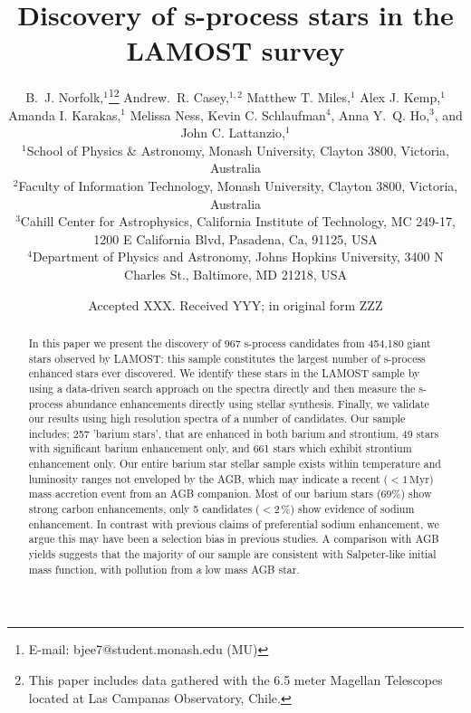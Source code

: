 \documentclass[a4paper,fleqn,usenatbib]{mnras}
\title[S-process stars in LAMOST]{Discovery of s-process stars in the LAMOST survey}
\author[Brodie.~J. Norfolk et al.]{B.~J. Norfolk,$^{1}$\thanks{E-mail: bjee7@student.monash.edu (MU)}\thanks{This paper includes data gathered with the 6.5 meter Magellan Telescopes located at Las Campanas Observatory, Chile.}
Andrew.~R. Casey,$^{1,2}$
Matthew T. Miles,$^{1}$
Alex J. Kemp,$^{1}$ \newauthor
Amanda I. Karakas,$^{1}$
Melissa Ness,
Kevin C. Schlaufman$^{4}$,
Anna Y.~Q. Ho,$^{3}$, \newauthor
and John C. Lattanzio,$^{1}$
\\
$^{1}$School of Physics \& Astronomy, Monash University, Clayton 3800, Victoria, Australia\\
$^{2}$Faculty of Information Technology, Monash University, Clayton 3800, Victoria, Australia\\
$^{3}$Cahill Center for Astrophysics, California Institute of Technology, MC 249-17, 1200 E California Blvd, Pasadena, Ca, 91125, USA\\
$^{4}$Department of Physics and Astronomy, Johns Hopkins University, 3400 N Charles St., Baltimore, MD 21218, USA
}
\date{Accepted XXX. Received YYY; in original form ZZZ}
\begin{document}
\label{firstpage}
\pagerange{\pageref{firstpage}--\pageref{lastpage}}
\maketitle

\begin{abstract}

In this paper we present the discovery of 967 s-process candidates from 454,180 giant stars observed by LAMOST: this sample constitutes the largest number of s-process enhanced stars ever discovered. We identify these stars in the LAMOST sample by using a data-driven search approach on the spectra directly and then measure the s-process abundance enhancements directly using stellar synthesis. Finally, we validate our results using high resolution spectra of a number of candidates. Our sample includes; 257 'barium stars', that are enhanced in both barium and strontium, 49 stars with significant barium enhancement only, and 661 stars which exhibit strontium enhancement only. Our entire barium star stellar sample exists within temperature and luminosity ranges not enveloped by the AGB, which may indicate a recent ($<1\,\textrm{Myr}$) mass accretion event from an AGB companion. Most of our barium stars ($69\%$) show strong carbon enhancements, only 5 candidates ($<2$\,\%) show evidence of sodium enhancement. In contrast with previous claims of preferential sodium enhancement, we argue this may have been a selection bias in previous studies. A comparison with AGB yields suggests that the majority of our sample are consistent with Salpeter-like initial mass function, with pollution from a low mass AGB star.


\end{abstract}
\end{document}
